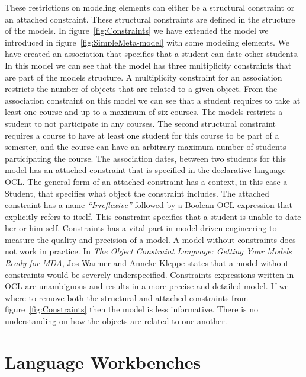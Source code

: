 These restrictions on modeling elements can either be a structural constraint or
an attached constraint. These structural constraints are defined in the structure
of the models. In figure~\ref{fig:Constraints} we have extended the model we
introduced in figure~\ref{fig:SimpleMeta-model} with some  modeling elements. We
have created an association that specifies that a student can date other
students. In this model we can see that the model has three multiplicity
constraints that are part of the models structure. A multiplicity constraint for
an association restricts the number of objects that are related to a given
object. From the association constraint on this model we can see that a student
requires to take at least one course and up to a maximum of six courses. The
models restricts a student to not participate in any courses. The second
structural constraint requires a course to have at least one student for
this course to be part of a semester, and the course can have an arbitrary
maximum number of students participating the course. The association dates,
between two students for this model has an attached constraint that is
specified in the declarative language OCL. The general form of an attached
constraint has a context, in this case a Student, that specifies what object the
constraint includes. The attached constraint has a name \textit{``Irreflexive''}
followed by a Boolean OCL expression that explicitly refers to itself. This constraint
specifies that a student is unable to date her or him self. Constraints has a
vital part in model driven engineering to measure the quality and precision of a
model. A model without constraints does not work in practice. In
\textit{The Object Constraint Language: Getting Your Models Ready for
MDA}\cite{Warmer:2003:OCL:861416}, Jos Warmer and Anneke Kleppe states that a
model without constraints would be severely underspecified. Constraints
expressions written in OCL are unambiguous and results in a more precise and
detailed model. If we where to remove both the structural and attached
constraints from figure~\ref{fig:Constraints} then the model is less
informative. There is no understanding on how the objects are related to
one another. 

\section{Language Workbenches}

